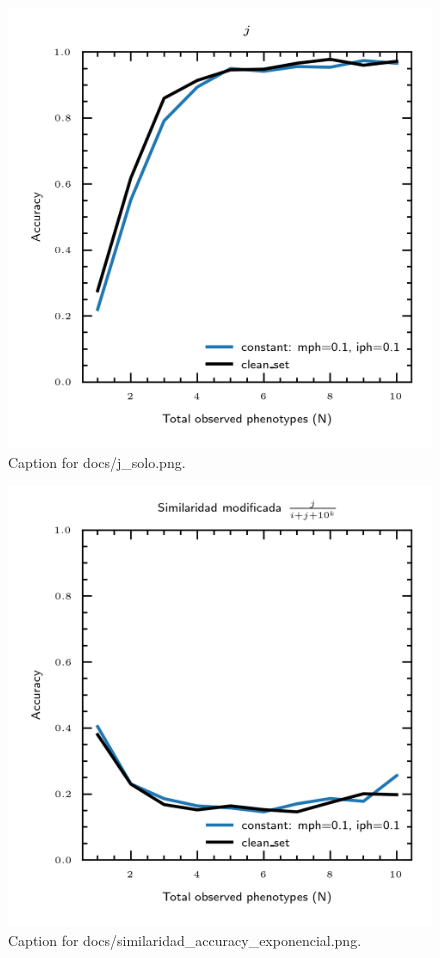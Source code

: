\documentclass{article}
\begin{document}
\begin{figure}[h] \centering \includegraphics{docs/j_solo.png} \caption{Caption for docs/j_solo.png.} \end{figure}
\begin{figure}[h] \centering \includegraphics{docs/similaridad_accuracy_exponencial.png} \caption{Caption for docs/similaridad_accuracy_exponencial.png.} \end{figure}
\end{document}
